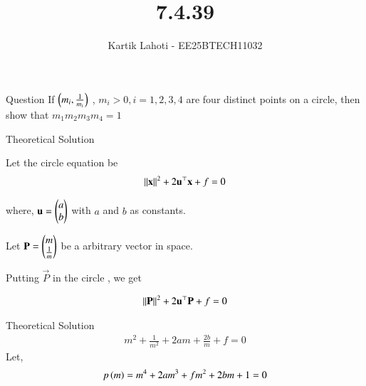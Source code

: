 \documentclass{beamer}
\title %
{7.4.39}
\author 
{Kartik Lahoti - EE25BTECH11032}
\begin{document}
\frame{\titlepage}
\begin{frame}{Question}
If $\left(m_i , \frac{1}{m_i}\right)$ , $m_i > 0 , i = 1, 2,3,4$ are four distinct points on a circle, then show that $m_1m_2m_3m_4 = 1 $
\end{frame}

\begin{frame}{Theoretical Solution}

Let the circle equation be 
\begin{align}
    \left\lVert\mathbf{x}\right\rVert^2 + 2\mathbf{u}^{\top}\mathbf{x} + f = 0 
\end{align}

where, $\mathbf{u} = \begin{pmatrix}a \\ b\end{pmatrix}$ with $a$ and $b$ as constants.

Let $\mathbf{P} = \begin{pmatrix}m \\ \frac{1}{m}\end{pmatrix}$ be a arbitrary vector in space.

Putting $\vec{P}$ in the circle , we get 

\begin{align}
    \left\lVert\mathbf{P}\right\rVert^2 + 2\mathbf{u}^{\top}\mathbf{P} + f = 0 
\end{align}

\end{frame}

\begin{frame}{Theoretical Solution}
\begin{align}
    m^2 + \frac{1}{m^2} + 2am + \frac{2b}{m} + f = 0
\end{align}
Let,
\begin{align}
  p\left(m\right) = m^4 + 2am^3 + fm^2 + 2bm + 1 = 0 \label{eq_1}
\end{align}

\end{frame}
\end{document}
